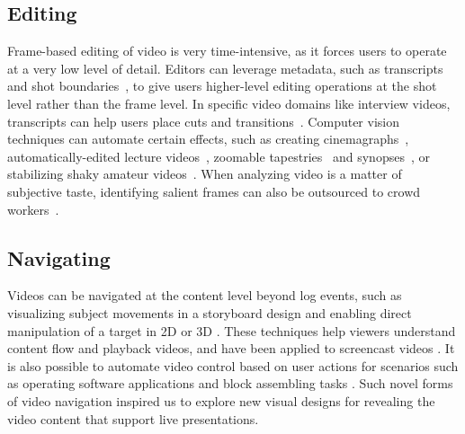 \subsection{Editing}
Frame-based editing of video is very time-intensive, as it forces users to operate at a very low level of detail. Editors can leverage metadata, such as transcripts~\cite{Berthouzoz:2012,Pavel:2014:VDB:2642918.2647400} and shot boundaries~\cite{Casares:2002dx}, to give users higher-level editing operations at the shot level rather than the frame level.
In specific video domains like interview videos, transcripts can help users place cuts and transitions~\cite{Berthouzoz:2012}.
%
Computer vision techniques can automate certain effects, such as creating cinemagraphs~\cite{Bai:2012, Joshi:2012}, automatically-edited lecture videos~\cite{Heck:2007}, zoomable tapestries~\cite{Barnes:2010} and synopses~\cite{Pritch:2009vl}, or stabilizing shaky amateur videos~\cite{Liu:2011}. When analyzing video is a matter of subjective taste, identifying salient frames can also be outsourced to crowd workers~\cite{Bernstein:2011uj}.

\subsection{Navigating}
Videos can be navigated at the content level beyond log events, such as visualizing subject movements in a storyboard design \cite{goldman2006schematic} and enabling direct manipulation of a target in 2D \cite{Dragicevic:2008:VBD:1357054.1357096,Goldman:2008:VOA:1449715.1449719,Karrer:2008:DDM:1357054.1357097} or 3D \cite{Nguyen:2013:DMV:2470654.2466150}. These techniques help viewers understand content flow and playback videos, and have been applied to screencast videos \cite{Denoue:2013:RDM:2451176.2451190}. It is also possible to automate video control based on user actions for scenarios such as operating software applications \cite{Pongnumkul:2011ju} and block assembling tasks \cite{Gupta:2012ku}. Such novel forms of video navigation inspired us to explore new visual designs for revealing the video content that support live presentations.

